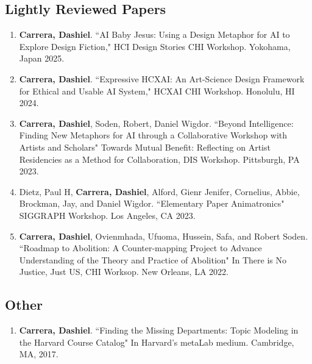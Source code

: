 \subsection{Lightly Reviewed Papers}
\begin{enumerate}

 \item \textbf{Carrera, Dashiel}. ``AI Baby Jesus: Using a Design Metaphor for AI to Explore Design Fiction," HCI Design Stories CHI Workshop. Yokohama, Japan 2025. \\

 \item \textbf{Carrera, Dashiel}. ``Expressive HCXAI: An Art-Science Design Framework for Ethical and Usable AI System," HCXAI CHI Workshop. Honolulu, HI 2024. \\
  \item \textbf{Carrera, Dashiel}, Soden, Robert, Daniel Wigdor. ``Beyond Intelligence: Finding New Metaphors for AI through a Collaborative Workshop with Artists and Scholars" Towards Mutual Benefit: Reflecting on Artist Residencies as a Method for Collaboration, DIS Workshop. Pittsburgh, PA 2023. \\
   \item  Dietz, Paul H, \textbf{Carrera, Dashiel}, Alford, Gienr Jenifer, Cornelius, Abbie, Brockman, Jay, and Daniel Wigdor. ``Elementary Paper Animatronics" SIGGRAPH Workshop. Los Angeles, CA 2023. \\
  \item \textbf{Carrera, Dashiel}, Ovienmhada, Ufuoma, Hussein, Safa, and Robert Soden. ``Roadmap to Abolition: A Counter-mapping Project to Advance Understanding of the Theory and Practice of Abolition" In There is No Justice, Just US, CHI Worksop. New Orleans, LA 2022. 
  \end{enumerate}
  
\subsection{Other}
\begin{enumerate}
\item \textbf{Carrera, Dashiel}. ``Finding the Missing Departments: Topic Modeling in the Harvard Course Catalog" In Harvard's metaLab medium. Cambridge, MA, 2017.\\
\end{enumerate} 



